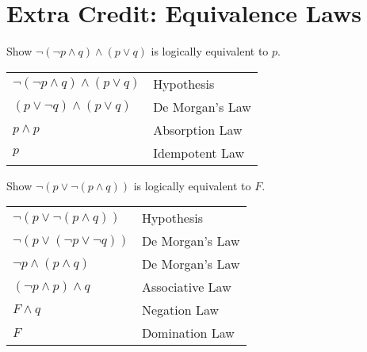 \documentclass[a4paper]{article}
\begin{document}
\bigskip 


\section{Extra Credit: Equivalence Laws}
Show $\neg(\neg p \land q) \land (p \lor q)$ is logically equivalent to $p$. \\
\begin{tabularx}{0.4\textwidth}{X X}
$\neg(\neg p \land q) \land (p \lor q)$ & Hypothesis \\
$(p \lor \neg q) \land (p \lor q)$ & De Morgan's Law \\
$p \land p$ & Absorption Law \\
$p$ & Idempotent Law
\end{tabularx}

\bigskip

Show $\neg(p \lor \neg(p \land q))$ is logically equivalent to $F$. \\
\begin{tabularx}{0.4\textwidth}{X X}
$\neg(p \lor \neg(p \land q))$ & Hypothesis \\
$\neg(p \lor (\neg p \lor \neg q))$ & De Morgan's Law \\
$\neg p \land (p \land q)$ & De Morgan's Law \\
$(\neg p \land p) \land q$ & Associative Law \\
$F \land q$ & Negation Law \\
$F$ & Domination Law
\end{tabularx}
\end{document}
